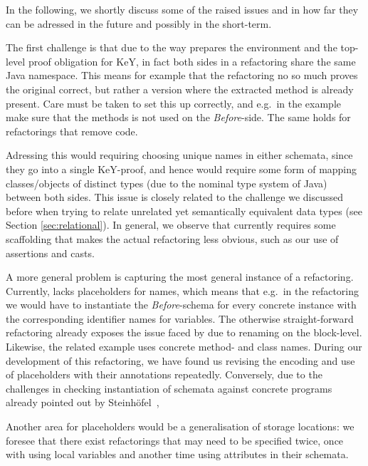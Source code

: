 In the following, we shortly discuss some of the raised issues and in how far they can be adressed in the future and possibly in the short-term.

The first challenge is that due to the way \Refinity{} prepares the environment and the top-level proof obligation for KeY,
in fact both sides in a refactoring share the same Java namespace.
This means for example that the  refactoring no so much proves the original correct, but rather a version where the extracted method is already present.
Care must be taken to set this up correctly, and e.g.\ in the  example make sure that the methods is not used on the \textit{Before}-side.
The same holds for refactorings that remove code.

Adressing this would requiring choosing unique names in either schemata, since they go into a single KeY-proof, and hence would require some form of mapping classes/objects of distinct types (due to the nominal type system of Java) between both sides.
This issue is closely related to the challenge we discussed before when trying to relate unrelated yet semantically equivalent data types (see Section \ref{sec:relational}).
In general, we observe that currently \Refinity{} requires some scaffolding that makes the actual refactoring less obvious,
such as our use of assertions and casts.

A more general problem is capturing the most general instance of a refactoring.
Currently, \Refinity{} lacks placeholders for names, which means that e.g.\ in the  refactoring we would have to instantiate the \textit{Before}-schema for every concrete instance with the corresponding identifier names for variables.
The otherwise straight-forward refactoring  already exposes the issue faced by \Refinity{} due to renaming on the block-level.
Likewise, the related  example uses concrete method- and class names.
During our development of this refactoring, we have found us revising the encoding and use of placeholders with their annotations repeatedly.
Conversely, due to the challenges in checking instantiation of schemata against concrete programs already pointed out by Steinhöfel~\cite[119,137]{steinhoefel-20},

Another area for placeholders would be a generalisation of storage locations:
we foresee that there exist refactorings that may need to be specified twice, once with using local variables and another time using attributes in their schemata.

